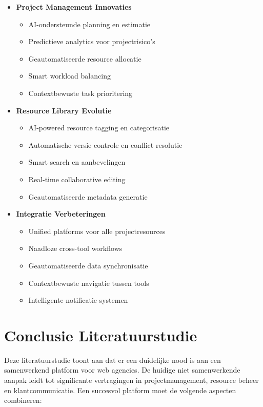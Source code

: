 \begin{itemize}
    \item \textbf{Project Management Innovaties}
    \begin{itemize}
        \item AI-ondersteunde planning en estimatie
        \item Predictieve analytics voor projectrisico's
        \item Geautomatiseerde resource allocatie
        \item Smart workload balancing
        \item Contextbewuste task prioritering
    \end{itemize}
    
    \item \textbf{Resource Library Evolutie}
    \begin{itemize}
        \item AI-powered resource tagging en categorisatie
        \item Automatische versie controle en conflict resolutie
        \item Smart search en aanbevelingen
        \item Real-time collaborative editing
        \item Geautomatiseerde metadata generatie
    \end{itemize}
    
    \item \textbf{Integratie Verbeteringen}
    \begin{itemize}
        \item Unified platforms voor alle projectresources
        \item Naadloze cross-tool workflows
        \item Geautomatiseerde data synchronisatie
        \item Contextbewuste navigatie tussen tools
        \item Intelligente notificatie systemen
    \end{itemize}
\end{itemize}

\section{Conclusie Literatuurstudie}
\label{sec:conclusie}

Deze literatuurstudie toont aan dat er een duidelijke nood is aan een samenwerkend platform voor web agencies. De huidige niet samenwerkende aanpak leidt tot significante vertragingen in projectmanagement, resource beheer en klantcommunicatie. Een succesvol platform moet de volgende aspecten combineren:

